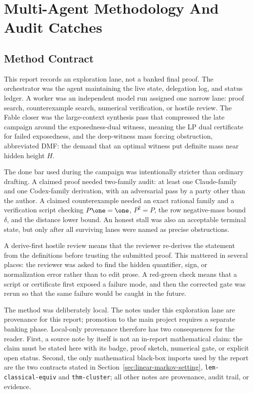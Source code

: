 \section{Multi-Agent Methodology And Audit Catches}

\subsection{Method Contract}

This report records an exploration lane, not a banked final proof.  The
orchestrator was the agent maintaining the live state, delegation log, and
status ledger.  A worker was an independent model run assigned one narrow
lane: proof search, counterexample search, numerical verification, or hostile
review.  The Fable closer was the large-context synthesis pass that compressed
the late campaign around the exposedness-dual witness, meaning the LP dual
certificate for failed exposedness, and the deep-witness mass forcing
obstruction, abbreviated DMF: the demand that an optimal witness put definite
mass near hidden height $H$.

The done bar used during the campaign was intentionally stricter than ordinary
drafting.  A claimed proof needed two-family audit: at least one Claude-family
and one Codex-family derivation, with an adversarial pass by a party other than
the author.  A claimed counterexample needed an exact rational family and a
verification script checking $P\one=\one$, $P^2=P$, the row negative-mass bound
$\delta$, and the distance lower bound.  An honest stall was also an acceptable
terminal state, but only after all surviving lanes were named as precise
obstructions.

A derive-first hostile review means that the reviewer re-derives the statement
from the definitions before trusting the submitted proof.  This mattered in
several places: the reviewer was asked to find the hidden quantifier, sign, or
normalization error rather than to edit prose.  A red-green check means that a
script or certificate first exposed a failure mode, and then the corrected gate
was rerun so that the same failure would be caught in the future.

The method was deliberately local.  The notes under this exploration lane are
provenance for this report; promotion to the main project requires a separate
banking phase.  Local-only provenance therefore has two consequences for the
reader.  First, a source note by itself is not an in-report mathematical claim:
the claim must be stated here with its badge, proof sketch, numerical gate, or
explicit open status.  Second, the only mathematical black-box imports used by
the report are the two contracts stated in Section~\ref{sec:linear-markov-setting},
\texttt{lem-classical-equiv} and \texttt{thm-cluster}; all other notes are
provenance, audit trail, or evidence.

